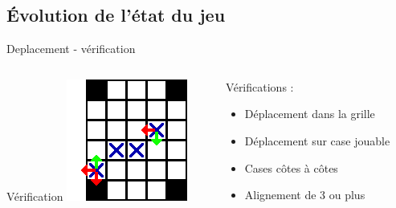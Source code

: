 \subsection{Évolution de l'état du jeu}

\begin{frame}{Deplacement - vérification}
	\begin{columns}
		\begin{column}{0.49\textwidth}
			\begin{block}{Vérification}
				\includegraphics[width=\textwidth]{imgs/verifDepl}
			\end{block}
		\end{column}
		\begin{column}{0.49\textwidth}
			Vérifications :
			\begin{itemize}
				\item
					Déplacement dans la grille
				\item
					Déplacement sur case jouable
				\item
					Cases côtes à côtes
				\item
					Alignement de 3 ou plus
			\end{itemize}
		\end{column}
	\end{columns}
\end{frame}

